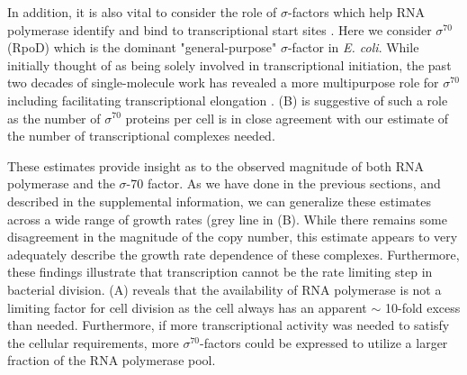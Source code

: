 In addition, it is also vital to consider the role of $\sigma$-factors which
help RNA polymerase identify and bind to transcriptional start sites
\citep{browning2016}. Here we consider $\sigma^{70}$ (RpoD) which is the
dominant "general-purpose" $\sigma$-factor in \textit{E. coli}. While initially
thought of as being solely involved in transcriptional initiation, the past two
decades of single-molecule work has revealed a more multipurpose role for
$\sigma^{70}$ including facilitating transcriptional elongation
\citep{kapanidis2005, goldman2015, perdue2011,mooney2003,mooney2005}.
 (B) is suggestive of such a role as the number of
$\sigma^{70}$ proteins per cell is in close agreement with our estimate of the
number of transcriptional complexes needed.

These estimates provide insight as to the observed magnitude of both RNA
polymerase and the $\sigma$-70 factor. As we have done in the previous sections,
and described in the supplemental information, we can generalize these estimates
across a wide range of growth rates (grey line in (B). While
there remains some disagreement in the magnitude of the copy number, this
estimate appears to very adequately describe the growth rate dependence of these
complexes. Furthermore, these findings illustrate that transcription
cannot be the rate limiting step in bacterial division.  (A)
reveals that the availability of RNA polymerase is not a limiting factor for
cell division as the cell always has an apparent $\sim$ 10-fold excess than needed.
Furthermore, if more transcriptional activity was needed to satisfy the cellular
requirements, more $\sigma^{70}$-factors could be expressed to utilize a larger
fraction of the RNA polymerase pool.
